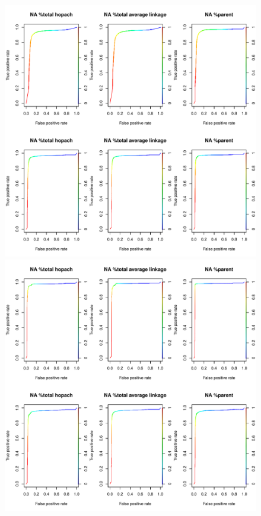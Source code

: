 \begin{figure}[H]
\begin{knitrout}
\includegraphics[width=\maxwidth]{figure/ch04_figunnamed-chunk-1-3} 

\includegraphics[width=\maxwidth]{figure/ch04_figunnamed-chunk-1-4} 


\end{knitrout}
\end{figure}
